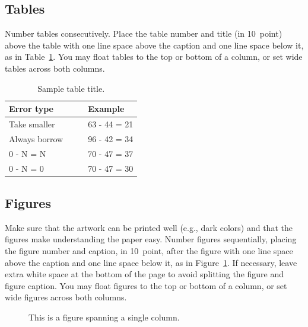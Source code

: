 \documentclass{ccn}  %
\begin{document}
\subsection{Tables}

Number tables consecutively.
Place the table number and title (in 10~point) above the table with one line space
above the caption and one line space below it, as in Table~\ref{sample-table}.
You may float tables to the top or bottom of a column, or set wide tables across both
columns.

\begin{table}[!ht]
  \begin{center}
    \caption{Sample table title.}
    \label{sample-table}
    \vskip 0.12in
    \begin{tabular}{ll}
      \hline
      Error type        & Example      \\
      \hline
      Take smaller      & 63 - 44 = 21 \\
      Always borrow~~~~ & 96 - 42 = 34 \\
      0 - N = N         & 70 - 47 = 37 \\
      0 - N = 0         & 70 - 47 = 30 \\
      \hline
    \end{tabular}
  \end{center}
\end{table}

\subsection{Figures}

Make sure that the artwork can be printed well (e.g., dark colors) and that the figures
make understanding the paper easy.
Number figures sequentially, placing the figure number and caption, in 10~point, after
the figure with one line space above the caption and one line space below it, as in
Figure~\ref{sample-figure}.
If necessary, leave extra white space at the bottom of the page to avoid splitting the
figure and figure caption.
You may float figures to the top or bottom of a column, or set wide figures across both
columns.

\begin{figure}[ht]
  \begin{center}
    \fbox{\rule[-.5cm]{0cm}{4cm} \rule[-.5cm]{4cm}{0cm}}
  \end{center}
  \caption{This is a figure spanning a single column.}
  \label{sample-figure}
\end{figure}
\end{document}
